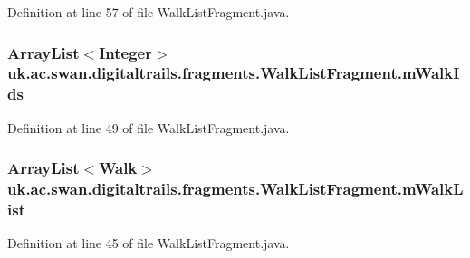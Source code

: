 Definition at line 57 of file Walk\+List\+Fragment.\+java.

\hypertarget{classuk_1_1ac_1_1swan_1_1digitaltrails_1_1fragments_1_1_walk_list_fragment_ad139fcdf5608a476e92466b389229931}{
\subsubsection[{m\+Walk\+Ids}]{\setlength{\rightskip}{0pt plus 5cm}Array\+List$<$Integer$>$ uk.\+ac.\+swan.\+digitaltrails.\+fragments.\+Walk\+List\+Fragment.\+m\+Walk\+Ids\hspace{0.3cm}{\ttfamily [protected]}}}\label{classuk_1_1ac_1_1swan_1_1digitaltrails_1_1fragments_1_1_walk_list_fragment_ad139fcdf5608a476e92466b389229931}


Definition at line 49 of file Walk\+List\+Fragment.\+java.

\hypertarget{classuk_1_1ac_1_1swan_1_1digitaltrails_1_1fragments_1_1_walk_list_fragment_a922fb05349e2afdb386f5ce03fdf6a7e}{
\subsubsection[{m\+Walk\+List}]{\setlength{\rightskip}{0pt plus 5cm}Array\+List$<${\bf Walk}$>$ uk.\+ac.\+swan.\+digitaltrails.\+fragments.\+Walk\+List\+Fragment.\+m\+Walk\+List\hspace{0.3cm}{\ttfamily [protected]}}}\label{classuk_1_1ac_1_1swan_1_1digitaltrails_1_1fragments_1_1_walk_list_fragment_a922fb05349e2afdb386f5ce03fdf6a7e}


Definition at line 45 of file Walk\+List\+Fragment.\+java.

